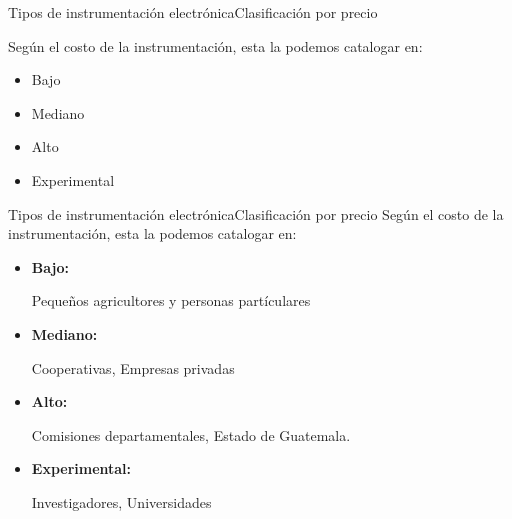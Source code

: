 \documentclass[]{beamer}
\begin{document}
\begin{frame}{Tipos de instrumentación electrónica}{Clasificación por precio}

  Según el costo de la instrumentación, esta la podemos catalogar en:
  \begin{itemize}
    \item Bajo
    \item Mediano
    \item Alto
    \item Experimental
  \end{itemize}
\end{frame}

\begin{frame}{Tipos de instrumentación electrónica}{Clasificación por precio}
  Según el costo de la instrumentación, esta la podemos catalogar en:
  \begin{itemize}
    \item \textbf{Bajo:}

      Pequeños agricultores y personas partículares
    \item \textbf{Mediano:}

      Cooperativas, Empresas privadas

    \item \textbf{Alto:}

      Comisiones departamentales, Estado de Guatemala.
    \item \textbf{Experimental:}

      Investigadores, Universidades
  \end{itemize}
\end{frame}
\end{document}
